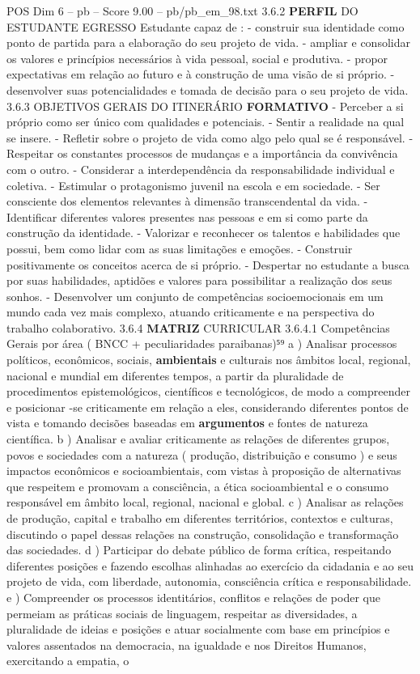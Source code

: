\begin{textsample}{POS Dim 6 – pb – Score 9.00 – pb/pb\_em\_98.txt}  \label{ex:f6_pos_206}
3.6.2 \textbf{PERFIL} DO ESTUDANTE EGRESSO Estudante capaz de : - construir sua identidade como ponto de partida para a elaboração do seu projeto de vida. - ampliar e consolidar os valores e princípios necessários à vida pessoal, social e produtiva. - propor expectativas em relação ao futuro e à construção de uma visão de si próprio. - desenvolver suas potencialidades e tomada de decisão para o seu projeto de vida. 3.6.3 OBJETIVOS GERAIS DO ITINERÁRIO \textbf{FORMATIVO} - Perceber a si próprio como ser único com qualidades e potenciais. - Sentir a realidade na qual se insere. - Refletir sobre o projeto de vida como algo pelo qual se é responsável. - Respeitar os constantes processos de mudanças e a importância da convivência com o outro. - Considerar a interdependência da responsabilidade individual e coletiva. - Estimular o protagonismo juvenil na escola e em sociedade. - Ser consciente dos elementos relevantes à dimensão transcendental da vida. - Identificar diferentes valores presentes nas pessoas e em si como parte da construção da identidade. - Valorizar e reconhecer os talentos e habilidades que possui, bem como lidar com as suas limitações e emoções. - Construir positivamente os conceitos acerca de si próprio. - Despertar no estudante a busca por suas habilidades, aptidões e valores para possibilitar a realização dos seus sonhos. - Desenvolver um conjunto de competências socioemocionais em um mundo cada vez mais complexo, atuando criticamente e na perspectiva do trabalho colaborativo. 3.6.4 \textbf{MATRIZ} CURRICULAR 3.6.4.1 Competências Gerais por área ( BNCC + peculiaridades paraibanas)⁵⁹ a ) Analisar processos políticos, econômicos, sociais, \textbf{ambientais} e culturais nos âmbitos local, regional, nacional e mundial em diferentes tempos, a partir da pluralidade de procedimentos epistemológicos, científicos e tecnológicos, de modo a compreender e posicionar -se criticamente em relação a eles, considerando diferentes pontos de vista e tomando decisões baseadas em \textbf{argumentos} e fontes de natureza científica. b ) Analisar e avaliar criticamente as relações de diferentes grupos, povos e sociedades com a natureza ( produção, distribuição e consumo ) e seus impactos econômicos e socioambientais, com vistas à proposição de alternativas que respeitem e promovam a consciência, a ética socioambiental e o consumo responsável em âmbito local, regional, nacional e global. c ) Analisar as relações de produção, capital e trabalho em diferentes territórios, contextos e culturas, discutindo o papel dessas relações na construção, consolidação e transformação das sociedades. d ) Participar do debate público de forma crítica, respeitando diferentes posições e fazendo escolhas alinhadas ao exercício da cidadania e ao seu projeto de vida, com liberdade, autonomia, consciência crítica e responsabilidade. e ) Compreender os processos identitários, conflitos e relações de poder que permeiam as práticas sociais de linguagem, respeitar as diversidades, a pluralidade de ideias e posições e atuar socialmente com base em princípios e valores assentados na democracia, na igualdade e nos Direitos Humanos, exercitando a empatia, o 
\end{textsample}
